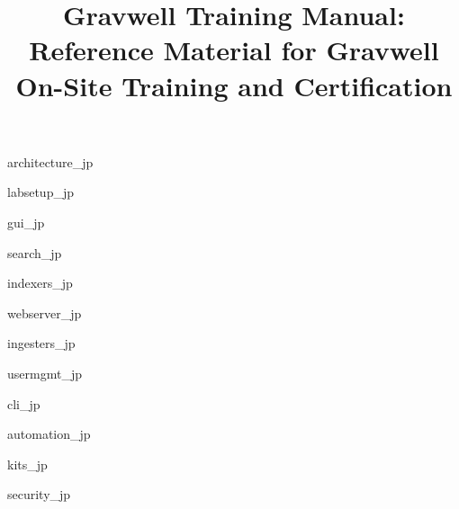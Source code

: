 \documentclass[]{report}
\date{}
\newcommand{\titlepicture}[2][]{%
  \renewcommand\placetitlepicture{%
    \texttt{[image: \#2]}\par\medskip
  }%
}
\newcommand{\placetitlepicture}{} %
\begin{document}
\titlepicture{img/image95.png}
\title{Gravwell Training Manual: Reference Material for Gravwell On-Site Training and Certification}
\maketitle

\newpage

\tableofcontents
\newpage




{architecture_jp}

{labsetup_jp}

{gui_jp}

{search_jp}

{indexers_jp}

{webserver_jp}

{ingesters_jp}

{usermgmt_jp}

{cli_jp}

{automation_jp}

{kits_jp}

{security_jp}

\end{document}
